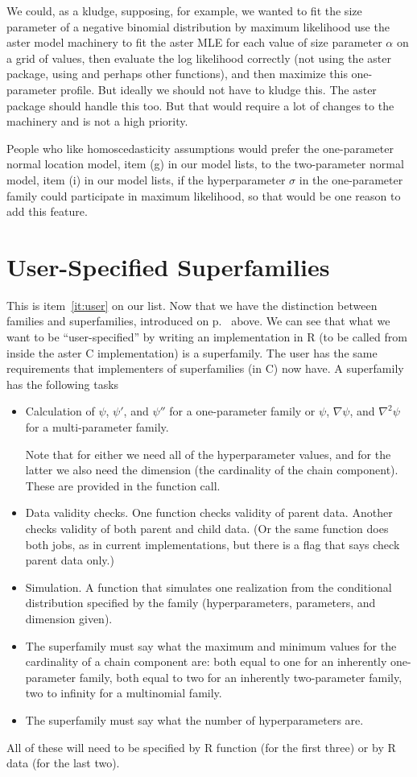\documentclass[11pt]{article}
\begin{document}
We could, as a kludge, supposing, for example, we wanted to fit the size
parameter of a negative binomial distribution by maximum likelihood
use the aster model machinery to fit the aster MLE for each value of
size parameter $\alpha$ on a grid of values, then evaluate the log likelihood
correctly (not using the aster package, using \verb@dnbinom@ and perhaps
other functions), and then maximize this one-parameter profile.
But ideally we should not have to kludge this.  The aster package should
handle this too.  But that would require a lot of changes to the machinery
and is not a high priority.

People who like homoscedasticity assumptions would prefer
the one-parameter normal location model, item (g) in our model lists,
to the two-parameter normal model, item (i)
in our model lists, if the hyperparameter $\sigma$ in the one-parameter
family could participate in maximum likelihood, so that would be one reason
to add this feature.

\section{User-Specified Superfamilies} \label{sec:user}

This is item~\ref{it:user} on our list.
Now that we have the distinction between families and superfamilies,
introduced on p.~\pageref{pg:super} above.  We can see that what we
want to be ``user-specified'' by writing an implementation in R
(to be called from inside the aster C implementation) is a superfamily.
The user has the same requirements that implementers of superfamilies
(in C) now have.  A superfamily has the following tasks
\begin{itemize}
\item Calculation of $\psi$, $\psi'$, and $\psi''$ for a one-parameter family
    or $\psi$, $\nabla \psi$, and $\nabla^2 \psi$ for a multi-parameter family.

    Note that for either we need all of the hyperparameter values, and for
    the latter we also need the dimension (the cardinality of the chain
    component).  These are provided in the function call.
\item Data validity checks.  One function checks validity of parent data.
    Another checks validity of both parent and child data.  (Or the same
    function does both jobs, as in current implementations, but there is
    a flag that says check parent data only.)
\item Simulation.  A function that simulates one realization from the
    conditional distribution specified by the family (hyperparameters,
    parameters, and dimension given).
\item The superfamily must say what the maximum and minimum values for
    the cardinality of a chain component are:
    both equal to one for an inherently one-parameter family,
    both equal to two for an inherently two-parameter family,
    two to infinity for a multinomial family.
\item The superfamily must say what the number of hyperparameters are.
\end{itemize}
All of these will need to be specified by R function (for the first three)
or by R data (for the last two).
\end{document}
